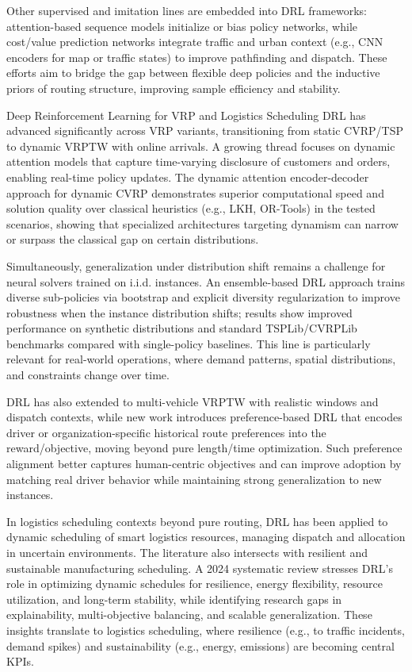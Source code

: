 Other supervised and imitation lines are embedded into DRL frameworks: attention-based sequence models initialize or bias policy networks, while cost/value prediction networks integrate traffic and urban context (e.g., CNN encoders for map or traffic states) to improve pathfinding and dispatch. These efforts aim to bridge the gap between flexible deep policies and the inductive priors of routing structure, improving sample efficiency and stability.​​

Deep Reinforcement Learning for VRP and Logistics Scheduling
DRL has advanced significantly across VRP variants, transitioning from static CVRP/TSP to dynamic VRPTW with online arrivals. A growing thread focuses on dynamic attention models that capture time-varying disclosure of customers and orders, enabling real-time policy updates. The dynamic attention encoder-decoder approach for dynamic CVRP demonstrates superior computational speed and solution quality over classical heuristics (e.g., LKH, OR-Tools) in the tested scenarios, showing that specialized architectures targeting dynamism can narrow or surpass the classical gap on certain distributions.​

Simultaneously, generalization under distribution shift remains a challenge for neural solvers trained on i.i.d. instances. An ensemble-based DRL approach trains diverse sub-policies via bootstrap and explicit diversity regularization to improve robustness when the instance distribution shifts; results show improved performance on synthetic distributions and standard TSPLib/CVRPLib benchmarks compared with single-policy baselines. This line is particularly relevant for real-world operations, where demand patterns, spatial distributions, and constraints change over time.​

DRL has also extended to multi-vehicle VRPTW with realistic windows and dispatch contexts, while new work introduces preference-based DRL that encodes driver or organization-specific historical route preferences into the reward/objective, moving beyond pure length/time optimization. Such preference alignment better captures human-centric objectives and can improve adoption by matching real driver behavior while maintaining strong generalization to new instances.​

In logistics scheduling contexts beyond pure routing, DRL has been applied to dynamic scheduling of smart logistics resources, managing dispatch and allocation in uncertain environments. The literature also intersects with resilient and sustainable manufacturing scheduling. A 2024 systematic review stresses DRL’s role in optimizing dynamic schedules for resilience, energy flexibility, resource utilization, and long-term stability, while identifying research gaps in explainability, multi-objective balancing, and scalable generalization. These insights translate to logistics scheduling, where resilience (e.g., to traffic incidents, demand spikes) and sustainability (e.g., energy, emissions) are becoming central KPIs.​

